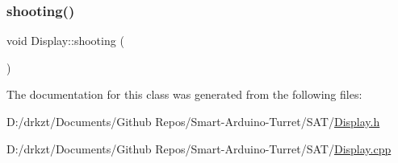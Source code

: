 \subsubsection{\texorpdfstring{shooting()}{shooting()}}
{\footnotesize\ttfamily void Display\+::shooting (\begin{DoxyParamCaption}{ }\end{DoxyParamCaption})}



The documentation for this class was generated from the following files\+:\begin{DoxyCompactItemize}
\item 
D\+:/drkzt/\+Documents/\+Github Repos/\+Smart-\/\+Arduino-\/\+Turret/\+S\+A\+T/\hyperlink{_display_8h}{Display.\+h}\item 
D\+:/drkzt/\+Documents/\+Github Repos/\+Smart-\/\+Arduino-\/\+Turret/\+S\+A\+T/\hyperlink{_display_8cpp}{Display.\+cpp}\end{DoxyCompactItemize}
